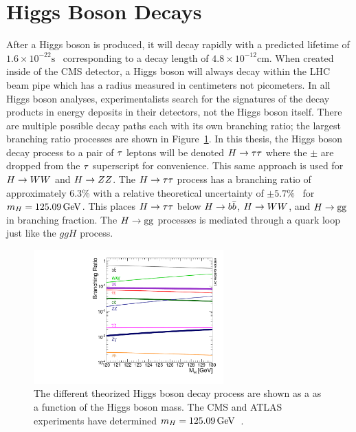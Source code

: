 \section{Higgs Boson Decays}
\label{sec:higgs_decays}
After a Higgs boson is produced, it will decay rapidly with a predicted lifetime
of $1.6 \times 10^{-22}\text{s}$~\cite{Dittmaier:2012vm} corresponding to a decay length of 
$4.8 \times 10^{-12}\text{cm}$. When created
inside of the CMS detector, a Higgs boson will always decay
within the LHC beam pipe which has a radius measured in centimeters not picometers. 
In all Higgs boson analyses, experimentalists search for the
signatures of the decay products in energy deposits in their detectors, not the Higgs
boson itself. There are multiple possible decay
paths each with its own branching ratio; the largest branching ratio
processes are shown in Figure~\ref{fig:higgs_decay}. 
In this thesis, the Higgs boson decay process to a pair of $\tau$ leptons will be denoted
$H\to\tau\tau$ where the $\pm$ are dropped from the $\tau$ superscript
for convenience. This same approach is used for $H\to WW$ and $H\to ZZ$.
The $H\to\tau\tau$ process has a branching
ratio of approximately 6.3\% with a relative theoretical uncertainty of 
$\pm5.7\%$~\cite{deFlorian:2016spz} for $m_{H} = 125.09\,\mathrm{GeV}$. This places $H\to\tau\tau$ below $H\to b\bar{b}$, 
$H\to WW$, and $H\to\text{g}\text{g}$ in branching fraction.
The $H\to\text{g}\text{g}$ processes is mediated through a quark loop just like the $ggH$ process.

\begin{figure}[htbp]
\centering
     \includegraphics[width=0.65\textwidth]{phenomenology_of_processes/plots/SMHiggsBR_YR4-square.pdf}
     \caption{
The different theorized Higgs boson decay process are shown as a 
as a function of the Higgs boson mass.
The CMS and ATLAS experiments have determined $m_{H} = 125.09\,\mathrm{GeV}$~\cite{Aad:2015zhl}.
     }
     \label{fig:higgs_decay}
\end{figure}

